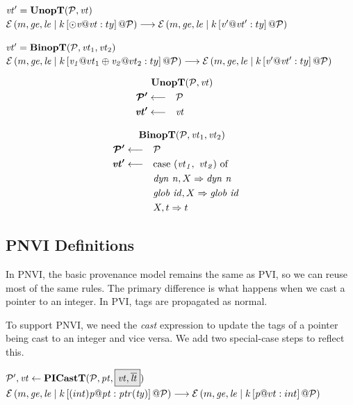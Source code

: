 \documentclass{article}
\begin{document}
            {\(\mathit{vt}' = \mathbf{UnopT}(\mathcal{P},\mathit{vt})\)}
            {\(\mathcal{E}\left(m,\mathit{ge},\mathit{le} \mid k \left[\odot \mathit{v} @ \mathit{vt} : ty\right] @ \mathcal{P}\right)
              \longrightarrow
              \mathcal{E}\left(m,\mathit{ge},\mathit{le} \mid k \left[\mathit{v'} @ \mathit{vt}' : ty\right] @ \mathcal{P}\right)\)}

            {\(\mathit{vt}' = \mathbf{BinopT}(\mathcal{P},\mathit{vt}_1,\mathit{vt}_2)\)}
            {\(\mathcal{E}\left(m,\mathit{ge},\mathit{le} \mid k \left[\mathit{v_1} @ vt_1 \oplus \mathit{v_2} @ vt_2 : ty\right] @ \mathcal{P}\right)
              \longrightarrow
              \mathcal{E}\left(m,\mathit{ge},\mathit{le} \mid k \left[\mathit{v'} @ \mathit{vt}' : ty\right] @ \mathcal{P}\right)\)}

\vspace{\abovedisplayskip}
            
\begin{minipage}[t]{.49\textwidth}            
  \[\begin{aligned}
  \truledef{\unopt{\PCT}{\vt}}
  \settag{\PCT'}{\PCT}
  \settag{\vt'}{\vt}
  \end{aligned}\]
\end{minipage}
\begin{minipage}[t]{.49\textwidth}           
  \[\begin{aligned}
  \truledef{\binopt{\PCT}{\vt_1}{\vt_2}}
  \settag{\PCT'}{\PCT}
  \settag{\vt'}{\caseof{(\vt_1,~ \vt_2)}}
  \caseentry{\mathit{dyn ~ n},X}{\mathit{dyn ~ n}} \\
  \caseentry{\mathit{glob ~ id},X}{\mathit{glob ~ id}} \\
  \caseentry{X,t}{t} \\
  \end{aligned}\]
\end{minipage}

\subsection{PNVI Definitions}

In PNVI, the basic provenance model remains the same as PVI, so we can reuse most of the
same rules. The primary difference is what happens when we cast a pointer to an integer.
In PVI, tags are propagated as normal.

To support PNVI, we need the {\it cast} expression to update the tags of a pointer
being cast to an integer and vice versa. We add two special-case steps to reflect this.

            {\(\trule{\PCT',\vt}{\picastt{\PCT}{\pt}{\vt}{\overline{\lt}}}\)}
            {\(\mathcal{E}\left(m,\mathit{ge},\mathit{le} \mid k \left[(int) \mathit{p} @ \mathit{pt} : \mathit{ptr(ty)}\right] @ \mathcal{P}\right) \longrightarrow
              \mathcal{E}\left(m,\mathit{ge},\mathit{le} \mid k \left[\mathit{p} @ vt : int\right] @ \mathcal{P}\right)\)}
\end{document}
